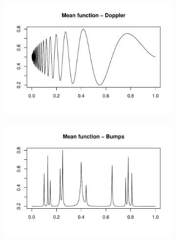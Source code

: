 \documentclass[12pt]{article}
\begin{document}
\begin{figure}
\begin{subfigure}[b]{0.48\textwidth}
        \caption{}
        \label{fig:gaus_blk}
    \end{subfigure}
		\hfill
    \begin{subfigure}[b]{0.48\textwidth}
        \centering
        \includegraphics[width=\textwidth]{gaus_dop.pdf}
        \caption{}
        \label{fig:gaus_dop}
    \end{subfigure}
		\hfill
    \begin{subfigure}[b]{0.48\textwidth}
        \centering
        \includegraphics[width=\textwidth]{gaus_bump.pdf}
        \caption{}
        \label{fig:gaus_bump}
    \end{subfigure}
		\hfill
		\begin{subfigure}[b]{0.48\textwidth}
        \centering

\end{subfigure}
\end{figure}
\end{document}
